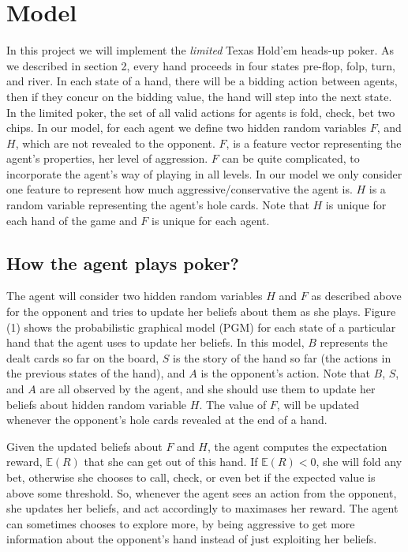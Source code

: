 \section{Model}
In this project we will implement the \emph{limited} Texas Hold'em heads-up poker. As we
described in section 2, every hand proceeds in four states pre-flop, folp, 
turn, and river. In each state of a hand, there will be a bidding action 
between agents, then if they concur on the bidding value, the hand will
step into the next state. In the limited poker, the set of all valid actions 
for agents is fold, check, bet two chips. In our model, for each agent
we define two hidden random variables $F$, and $H$, which are not revealed to the
opponent. $F$, is a feature vector representing the agent's properties, \ie her 
level of aggression. $F$ can be quite complicated, to incorporate the 
agent's way of playing in all levels. In our model we only consider one feature 
to represent how much aggressive/conservative the agent is. $H$ is a random
variable representing the agent's hole cards. Note that $H$ is unique for 
each hand of the game and $F$ is unique for each agent.

\subsection{How the agent plays poker?}
The agent will consider two hidden random variables $H$ and $F$ as described above 
for the opponent and tries to update her beliefs about them as she plays. Figure (1) shows the
probabilistic graphical model (PGM) for each state of a 
particular hand that the agent uses to update her 
beliefs. In this model, $B$ represents the dealt cards so far on the board, $S$ is the 
story of the hand so far (\ie the actions in the previous states of the hand), and 
$A$ is the opponent's action. Note that $B$, $S$, and $A$ are all observed by the
agent, and she should use them to update her beliefs about hidden random variable
$H$. The value of $F$, will be updated whenever the opponent's hole cards revealed
at the end of a hand. 

Given the updated beliefs about $F$ and $H$, the agent computes the expectation reward, 
$\mathbb{E}(R)$ that she can get out of this hand. If $\mathbb{E}(R) <0$, she will
fold any bet, otherwise she chooses to call, check, or even bet if the expected value 
is above some threshold. So, whenever the agent sees an action from the opponent, she
updates her beliefs, and act accordingly to maximases her reward. The agent can sometimes
chooses to explore more, by being aggressive to get more information about the 
opponent's hand instead of just exploiting her beliefs. 
 
